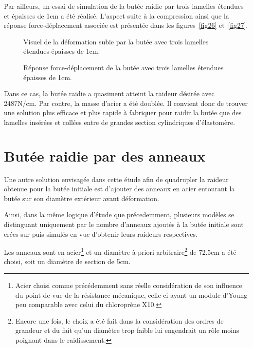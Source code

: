 ﻿\documentclass{article}
\newcommand{\abaqus}{\bsc{Abaqus}\xspace}
\begin{document}
Par ailleurs, un essai de simulation de la butée raidie par trois lamelles étendues et épaisses de 1cm a été réalisé. L'aspect suite à la compression ainsi que la réponse force-déplacement associée est présentée dans les figures~\ref{fig26} et~\ref{fig27}.

\begin{figure}[htbp]
	\begin{minipage}[c]{.45\linewidth}
	\begin{center}
	\caption{Visuel de la déformation subie par la butée avec trois lamelles étendues épaisses de 1cm.}
	\label{fig24}
	\end{center}
	\end{minipage}
	\hfill
	\begin{minipage}[c]{.45\linewidth}
	\begin{center}
	\caption{Réponse force-déplacement de la butée avec trois lamelles étendues épaisses de 1cm.}
	\label{fig25}
	\end{center}
	\end{minipage}
\end{figure}

Dans ce cas, la butée raidie a quasiment atteint la raideur désirée avec 2487N/cm. Par contre, la masse d'acier a été doublée. Il convient donc de trouver une solution plus efficace et plus rapide à fabriquer pour raidir la butée que des lamelles insérées et collées entre de grandes section cylindriques d'élastomère. 

\section{Butée raidie par des anneaux}
Une autre solution envisagée dans cette étude afin de quadrupler la raideur obtenue pour la butée initiale est d'ajouter des anneaux en acier entourant la butée sur son diamètre extérieur avant déformation.

Ainsi, dans la même logique d'étude que précedemment, plusieurs modèles se distinguant uniquement par le nombre d'anneaux ajoutés à la butée initiale sont crées sur \abaqus puis simulés en vue d'obtenir leurs raideurs respectives.

Les anneaux sont en acier\footnote{Acier choisi comme précédemment sans réelle considération de son influence du point-de-vue de la résistance mécanique, celle-ci ayant un module d'Young peu comparable avec celui du chloroprène X10.} et un diamètre à-priori arbitraire\footnote{Encore une fois, le choix a été fait dans la considération des ordres de grandeur et du fait qu'un diamètre trop faible lui engendrait un rôle moins poignant dans le raidissement.} de 72.5cm a été choisi, soit un diamètre de section de 5cm.
\end{document}
